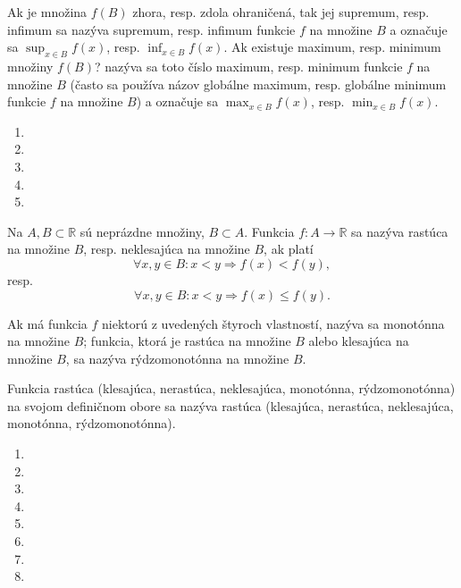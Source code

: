 Ak je množina $f(B)$ zhora, resp. zdola ohraničená, tak jej supremum, resp.
infimum sa nazýva supremum, resp. infimum funkcie $f$ na množine $B$ a označuje
sa $\sup_{x\in B} f(x)$, resp. $\inf_{x\in B} f(x)$. Ak existuje maximum, resp.
minimum množiny $f(B)$? nazýva sa toto číslo maximum, resp. minimum funkcie $f$
na množine $B$ (často sa používa názov globálne maximum, resp. globálne minimum
funkcie $f$ na množine $B$) a označuje sa $\max_{x\in B}f(x)$, resp. $\min_{x\in
B}f(x)$.


\begin{enumerate}[resume]
  \item {}
  \item {}
  \item {}
  \item {}
  \item {}
\end{enumerate}

Na $A,B\subset\mathbb{R}$ sú neprázdne množiny, $B\subset A$. Funkcia
$f:A\rightarrow\mathbb{R}$ sa nazýva rastúca na množine $B$, resp. neklesajúca
na množine $B$, ak platí $$\forall x,y\in B:x<y\Rightarrow f(x)<f(y),$$ resp.
$$\forall x,y\in B:x<y\Rightarrow f(x)\leq f(y).$$

Ak má funkcia $f$ niektorú z uvedených štyroch vlastností, nazýva sa monotónna
na množine $B$; funkcia, ktorá je rastúca na množine $B$ alebo klesajúca na
množine $B$, sa nazýva rýdzomonotónna na množine $B$.

Funkcia rastúca (klesajúca, nerastúca, neklesajúca, monotónna, rýdzomonotónna)
na svojom definičnom obore sa nazýva rastúca (klesajúca, nerastúca, neklesajúca,
monotónna, rýdzomonotónna).

\begin{enumerate}[resume]
  \item {}
  \item {}
  \item {}
  \showanswers
  \item {}
  \hideanswers
  \item {}
  \item {}
  \item {}
  \item {}
\end{enumerate}

